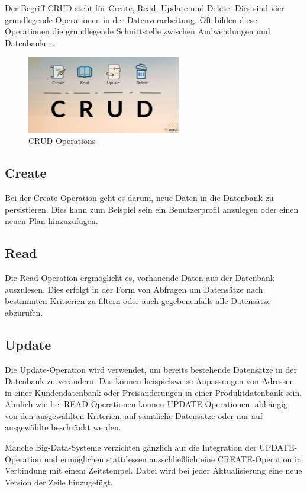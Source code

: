 Der Begriff CRUD steht für Create, Read, Update und Delete. Dies sind vier grundlegende Operationen in der Datenverarbeitung. Oft bilden diese Operationen die grundlegende Schnittstelle zwischen Andwendungen und Datenbanken.

\begin{figure}[h!]
    \centering
    \includegraphics[width=0.6\textwidth]{pics/CRUD.jpeg}
    \caption{CRUD Operations}
    \label{fig:enter-label}
\end{figure}


 \subsection{Create}

 Bei der Create Operation geht es darum, neue Daten in die Datenbank zu persistieren. Dies kann zum Beispiel sein ein Benutzerprofil anzulegen oder einen neuen Plan hinzuzufügen. 


 \subsection{Read}

 Die Read-Operation ergmöglicht es, vorhanende Daten aus der Datenbank auszulesen. Dies erfolgt in der Form von Abfragen um Datensätze nach bestimmten Kritierien zu filtern oder auch gegebenenfalls alle Datensätze abzurufen.


\subsection{Update}

Die Update-Operation wird verwendet, um bereits bestehende Datensätze in der Datenbank zu verändern. Das können beispielsweise Anpassungen von Adressen in einer Kundendatenbank oder Preisänderungen in einer Produktdatenbank sein. Ähnlich wie bei READ-Operationen können UPDATE-Operationen, abhängig von den ausgewählten Kriterien, auf sämtliche Datensätze oder nur auf ausgewählte beschränkt werden.

Manche Big-Data-Systeme verzichten gänzlich auf die Integration der UPDATE-Operation und ermöglichen stattdessen ausschließlich eine CREATE-Operation in Verbindung mit einem Zeitstempel. Dabei wird bei jeder Aktualisierung eine neue Version der Zeile hinzugefügt.


